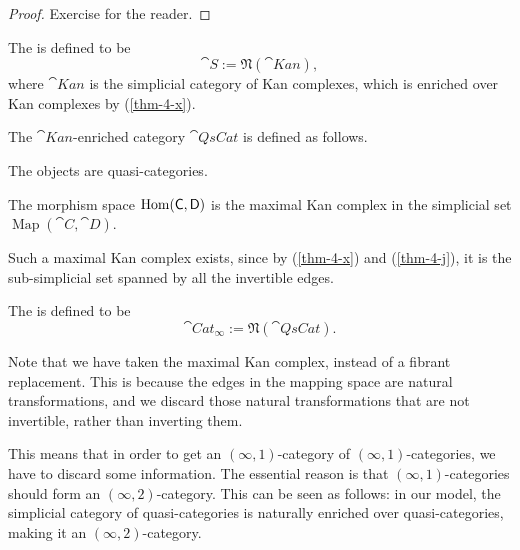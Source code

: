 \begin{proof}
    Exercise for the reader.
\end{proof}

\begin{example}
    The  is defined to be
    \[\cat S:=\mathfrak N(\cat{Kan}),\]
    where $\cat{Kan}$ is the simplicial category of Kan complexes,
    which is enriched over Kan complexes by (\ref{thm-4-x}).
    \varqed
\end{example}

\begin{example}
    The $\cat{Kan}$-enriched category $\cat{QsCat}$
    is defined as follows.
    \begin{itms}
        \item The objects are quasi-categories.
        \item The morphism space $\operatorname{Hom}(\textup{\textsf{C}},\textup{\textsf{D}})$
        is the maximal Kan complex in the simplicial set $\operatorname{Map}(\cat C,\cat D)$.
    \end{itms}
    Such a maximal Kan complex exists,
    since by (\ref{thm-4-x}) and (\ref{thm-4-j}),
    it is the sub-simplicial set spanned by all the invertible edges.

    The  is defined to be 
    \[\cat{Cat}_\infty:=\mathfrak N(\cat{QsCat}).\]

    Note that we have taken the maximal Kan complex, instead of a fibrant replacement.
    This is because the edges in the mapping space are natural transformations,
    and we discard those natural transformations that are not invertible,
    rather than inverting them.

    This means that in order to get an $(\infty,1)$-category of $(\infty,1)$-categories,
    we have to discard some information.
    The essential reason is that $(\infty,1)$-categories should form an $(\infty,2)$-category.
    This can be seen as follows:
    in our model, the simplicial category of quasi-categories
    is naturally enriched over quasi-categories,
    making it an $(\infty,2)$-category. \varqed
\end{example}

